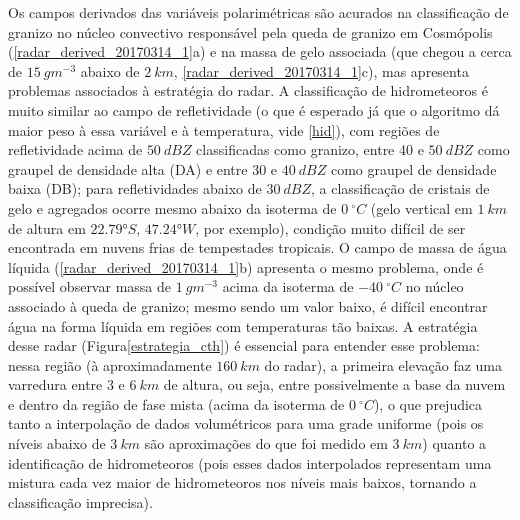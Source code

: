 Os campos derivados das variáveis polarimétricas são acurados na classificação de granizo no núcleo convectivo responsável pela queda de granizo em Cosmópolis (\autoref{radar_derived_20170314_1}a) e na massa de gelo associada (que chegou a cerca de $15\:gm^{-3}$ abaixo de $2\:km$, \autoref{radar_derived_20170314_1}c), mas apresenta problemas associados à estratégia do radar. A classificação de hidrometeoros é muito similar ao campo de refletividade (o que é esperado já que o algoritmo dá maior peso à essa variável e à temperatura, vide \autoref{hid}), com regiões de refletividade acima de $50\:dBZ$ classificadas como granizo, entre 40 e $50\:dBZ$ como graupel de densidade alta (DA) e entre 30 e $40\:dBZ$ como graupel de densidade baixa (DB); para refletividades abaixo de $30\:dBZ$, a classificação de cristais de gelo e agregados ocorre mesmo abaixo da isoterma de $0\:^{\circ}C$ (gelo vertical em $1\:km$ de altura em $\ang{22.79}S$, $\ang{47.24}W$, por exemplo), condição muito difícil de ser encontrada em nuvens frias de tempestades tropicais. O campo de massa de água líquida (\autoref{radar_derived_20170314_1}b) apresenta o mesmo problema, onde é possível observar massa de $1\:gm^{-3}$ acima da isoterma de $-40\:^{\circ}C$ no núcleo associado à queda de granizo; mesmo sendo um valor baixo, é difícil encontrar água na forma líquida em regiões com temperaturas tão baixas. A estratégia desse radar (Figura\autoref{estrategia_cth}) é essencial para entender esse problema: nessa região (à aproximadamente $160\:km$ do radar), a primeira elevação faz uma varredura entre 3 e $6\:km$ de altura, ou seja, entre possivelmente a base da nuvem e dentro da região de fase mista (acima da isoterma de $0\:^{\circ}C$), o que prejudica tanto a interpolação de dados volumétricos para uma grade uniforme (pois os níveis abaixo de $3\:km$ são aproximações do que foi medido em $3\:km$) quanto a identificação de hidrometeoros (pois esses dados interpolados representam uma mistura cada vez maior de hidrometeoros nos níveis mais baixos, tornando a classificação imprecisa).

